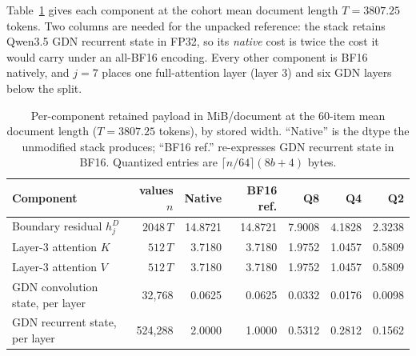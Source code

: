 \documentclass{article}
\begin{document}
Table~\ref{tab:store-components} gives each component at the cohort mean
document length $T=3807.25$ tokens.  Two columns are needed for the unpacked
reference: the stack retains Qwen3.5 GDN recurrent state in FP32, so its
\emph{native} cost is twice the cost it would carry under an all-BF16 encoding.
Every other component is BF16 natively, and $j=7$ places one full-attention
layer (layer 3) and six GDN layers below the split.

\begin{table}[H]
  \caption{Per-component retained payload in MiB/document at the 60-item mean
document length ($T=3807.25$ tokens), by stored width.  ``Native'' is the dtype
the unmodified stack produces; ``BF16 ref.'' re-expresses GDN recurrent state
in BF16.  Quantized entries are $\lceil n/64\rceil(8b+4)$ bytes.}
  \label{tab:store-components}
  \centering\small
  \begin{tabular}{@{}lrrrrrr@{}}
    \toprule
    Component & values $n$ & Native & BF16 ref. & Q8 & Q4 & Q2 \\
    \midrule
    Boundary residual $h_j^D$ & $2048\,T$ & 14.8721 & 14.8721 & 7.9008 & 4.1828 & 2.3238 \\
    Layer-3 attention $K$ & $512\,T$ & 3.7180 & 3.7180 & 1.9752 & 1.0457 & 0.5809 \\
    Layer-3 attention $V$ & $512\,T$ & 3.7180 & 3.7180 & 1.9752 & 1.0457 & 0.5809 \\
    GDN convolution state, per layer & 32{,}768 & 0.0625 & 0.0625 & 0.0332 & 0.0176 & 0.0098 \\
    GDN recurrent state, per layer & 524{,}288 & 2.0000 & 1.0000 & 0.5312 & 0.2812 & 0.1562 \\
    \bottomrule
  \end{tabular}
\end{table}
\end{document}
